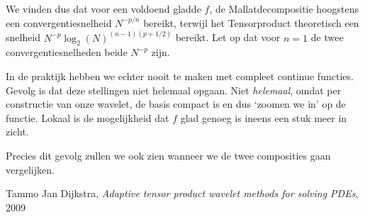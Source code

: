 \documentclass[11pt]{amsart}
\begin{document}
We vinden dus dat voor een voldoend gladde $f$, de Mallatdecompositie hoogstens een convergentiesnelheid $N^{-p/n}$ bereikt, terwijl het Tensorproduct theoretisch een snelheid $N^{-p} \log_2(N)^{(n-1)(p+1/2)}$ bereikt. Let op dat voor $n=1$ de twee convergentiesnelheden beide $N^{-p}$ zijn.

In de praktijk hebben we echter nooit te maken met compleet continue functies. Gevolg is dat deze stellingen niet helemaal opgaan. Niet \emph{helemaal}, omdat per constructie van onze wavelet, de basis compact is en dus `zoomen we in' op de functie. Lokaal is de mogelijkheid dat $f$ glad genoeg is ineens een stuk meer in zicht.

Precies dit gevolg zullen we ook zien wanneer we de twee composities gaan vergelijken.

\begin{thebibliography}{9}

Tammo Jan Dijkstra,
\emph{Adaptive tensor product wavelet methods for solving PDEs}, 2009
\end{thebibliography}
\end{document}
